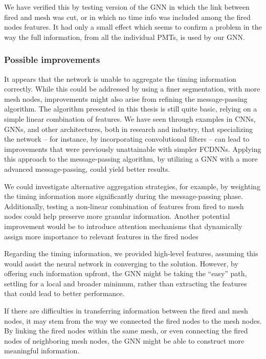 \documentclass[../main.tex]{subfiles}
\begin{document}
We have verified this by testing version of the GNN in which the link between fired and mesh was cut, or in which no time info was included among the fired nodes features. It had only a small effect
which seems to confirm a problem in the way the full information, from all the individual PMTs, is used by our GNN.


\subsubsection{Possible improvements}


It appears that the network is unable to aggregate the timing information correctly. While this could be addressed by using a finer segmentation, with more mesh nodes, improvements might also arise from refining the message-passing algorithm. The algorithm presented in this thesis is still quite basic, relying on a simple linear combination of features. We have seen through examples in CNNs, GNNs, and other architectures, both in research and industry, that specializing the network -- for instance, by incorporating convolutional filters -- can lead to improvements that were previously unattainable with simpler FCDNNs. Applying this approach to the message-passing algorithm, by utilizing a GNN with a more advanced message-passing, could yield better results.

We could investigate alternative aggregation strategies, for example, by weighting the timing information more significantly during the message-passing phase. Additionally, testing a non-linear combination of features from fired to mesh nodes could help preserve more granular information. Another potential improvement would be to introduce attention mechanisms that dynamically assign more importance to relevant features in the fired nodes

Regarding the timing information, we provided high-level features, assuming this would assist the neural network in converging to the solution. However, by offering such information upfront, the GNN might be taking the ``easy'' path, settling for a local and broader minimum, rather than extracting the features that could lead to better performance.

If there are difficulties in transferring information between the fired and mesh nodes, it may stem from the way we connected the fired nodes to the mesh nodes. By linking the fired nodes within the same mesh, or even connecting the fired nodes of neighboring mesh nodes, the GNN might be able to construct more meaningful information.
\end{document}
